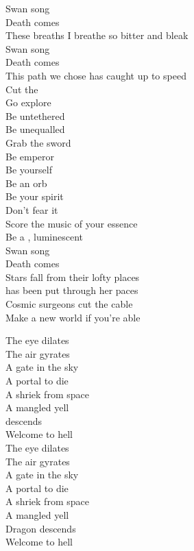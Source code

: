 Swan song \\
Death comes \\
These breaths I breathe so bitter and bleak \\
Swan song \\
Death comes \\
This path we chose has caught up to speed \\

Cut the  \\
Go explore \\
Be untethered \\
Be unequalled \\
Grab the sword \\
Be emperor \\
Be yourself \\
Be an orb \\
Be your spirit \\
Don't fear it \\
Score the music of your essence \\
Be a , luminescent \\
Swan song \\
Death comes \\

Stars fall from their lofty places \\
 has been put through her paces \\
Cosmic surgeons cut the cable \\
Make a new world if you're able \\


The eye dilates \\
The air gyrates \\
A gate in the sky \\
A portal to die \\
A shriek from space \\
A mangled yell \\
 descends \\
Welcome to hell \\

The eye dilates \\
The air gyrates \\
A gate in the sky \\
A portal to die \\
A shriek from space \\
A mangled yell \\
Dragon descends \\
Welcome to hell \\

